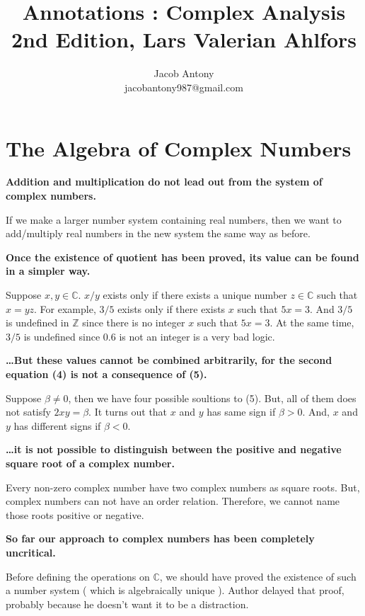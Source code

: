 \documentclass[a4paper,12pt,openany]{book}
\title{Annotations : Complex Analysis\\2nd Edition, Lars Valerian Ahlfors}
\author{Jacob Antony\\jacobantony987@gmail.com}
\begin{document}
\maketitle

\chapter{The Algebra of Complex Numbers}
\textbf{\phantom{}}
\textbf{Addition and multiplication do not lead out from the system of complex numbers.}\\
\begin{story}
	If we make a larger number system containing real numbers, then we want to add/multiply real numbers in the new system the same way as before.
\end{story}

\textbf{\phantom{}}
\textbf{Once the existence of quotient has been proved, its value can be found in a simpler way.}\\
\begin{story}
	Suppose $x,y \in \mathbb{C}$.
	$x/y$ exists only if there exists a unique number $z \in \mathbb{C}$ such that $x = yz$.
	For example, $3/5$ exists only if there exists $x$ such that $5x = 3$.
	And $3/5$ is undefined in $\mathbb{Z}$ since there is no integer $x$ such that $5x = 3$.
	At the same time, $3/5$ is undefined since $0.6$ is not an integer is a very bad logic.
\end{story}

\textbf{\phantom{}}
\textbf{\dots But these values cannot be combined arbitrarily, for the second equation (4) is not a consequence of (5).}\\
\begin{story}
	Suppose $\beta \ne 0$, then we have four possible soultions to (5).
	But, all of them does not satisfy $2xy = \beta$.
	It turns out that $x$ and $y$ has same sign if $\beta > 0$.
	And, $x$ and $y$ has different signs if $\beta < 0$.
\end{story}

\textbf{\phantom{}}
\textbf{\dots it is not possible to distinguish between the positive and negative square root of a complex number.}\\
\begin{story}
	Every non-zero complex number have two complex numbers as square roots.
	But, complex numbers can not have an order relation.
	Therefore, we cannot name those roots positive or negative.
\end{story}

\textbf{\phantom{}}
\textbf{So far our approach to complex numbers has been completely uncritical.}\\
\begin{story}
	Before defining the operations on $\mathbb{C}$, we should have proved the existence of such a number system ( which is algebraically unique ).
	Author delayed that proof, probably because he doesn't want it to be a distraction.
\end{story}


%


\end{document}
